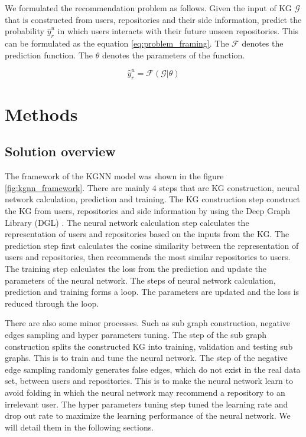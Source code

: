 \documentclass[11pt,twoside]{report}
\begin{document}
We formulated the recommendation problem as follows. Given the input of KG $\mathcal{G}$ that is constructed from users, repositories and their side information, predict the probability $\hat{y}_r^u$ in which users interacts with their future unseen repositories. This can be formulated as the equation \ref{eq:problem_framing}. The $\mathcal{F}$ denotes the prediction function. The $\theta$ denotes the parameters of the function.

\begin{equation}
    \hat{y}_r^u=\mathcal{F}(\mathcal{G}|\theta)
    \label{eq:problem_framing}
\end{equation}

\chapter{Methods}
\section{Solution overview}
The framework of the KGNN model was shown in the figure \ref{fig:kgnn_framework}. There are mainly 4 steps that are KG construction, neural network calculation, prediction and training. The KG construction step construct the KG from users, repositories and side information by using the Deep Graph Library (DGL) \cite{wang2019dgl}. The neural network calculation step calculates the representation of users and repositories based on the inputs from the KG. The prediction step first calculates the cosine similarity between the representation of users and repositories, then recommends the most similar repositories to users. The training step calculates the loss from the prediction and update the parameters of the neural network. The steps of neural network calculation, prediction and training forms a loop. The parameters are updated and the loss is reduced through the loop.

There are also some minor processes. Such as sub graph construction, negative edges sampling and hyper parameters tuning. The step of the sub graph construction splits the constructed KG into training, validation and testing sub graphs. This is to train and tune the neural network. The step of the negative edge sampling randomly generates false edges, which do not exist in the real data set, between users and repositories. This is to make the neural network learn to avoid folding \cite{xin_folding_2017} in which the neural network may recommend a repository to an irrelevant user. The hyper parameters tuning step tuned the learning rate and drop out rate to maximize the learning performance of the neural network. We will detail them in the following sections.
 
\end{document}
